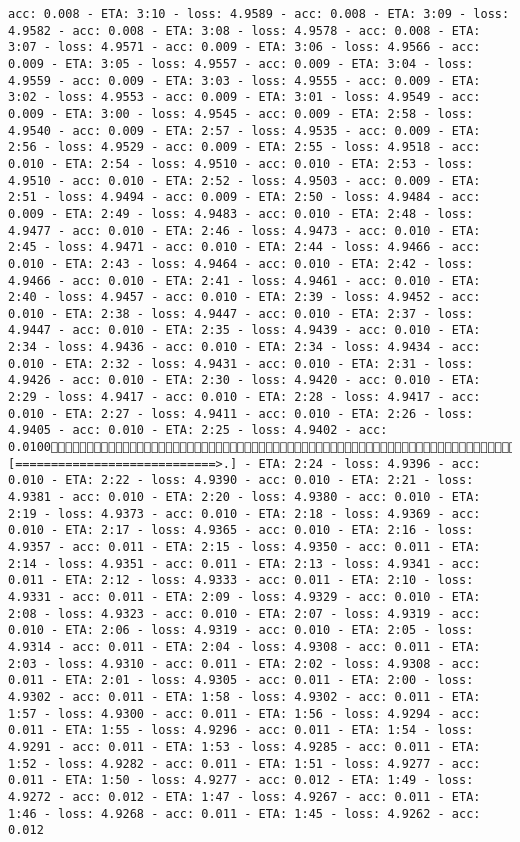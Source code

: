 \documentclass[11pt]{article}
\begin{document}
\begin{Verbatim}[commandchars=\\\{\}]
acc: 0.008 - ETA: 3:10 - loss: 4.9589 - acc: 0.008 - ETA: 3:09 - loss: 4.9582 - acc: 0.008 - ETA: 3:08 - loss: 4.9578 - acc: 0.008 - ETA: 3:07 - loss: 4.9571 - acc: 0.009 - ETA: 3:06 - loss: 4.9566 - acc: 0.009 - ETA: 3:05 - loss: 4.9557 - acc: 0.009 - ETA: 3:04 - loss: 4.9559 - acc: 0.009 - ETA: 3:03 - loss: 4.9555 - acc: 0.009 - ETA: 3:02 - loss: 4.9553 - acc: 0.009 - ETA: 3:01 - loss: 4.9549 - acc: 0.009 - ETA: 3:00 - loss: 4.9545 - acc: 0.009 - ETA: 2:58 - loss: 4.9540 - acc: 0.009 - ETA: 2:57 - loss: 4.9535 - acc: 0.009 - ETA: 2:56 - loss: 4.9529 - acc: 0.009 - ETA: 2:55 - loss: 4.9518 - acc: 0.010 - ETA: 2:54 - loss: 4.9510 - acc: 0.010 - ETA: 2:53 - loss: 4.9510 - acc: 0.010 - ETA: 2:52 - loss: 4.9503 - acc: 0.009 - ETA: 2:51 - loss: 4.9494 - acc: 0.009 - ETA: 2:50 - loss: 4.9484 - acc: 0.009 - ETA: 2:49 - loss: 4.9483 - acc: 0.010 - ETA: 2:48 - loss: 4.9477 - acc: 0.010 - ETA: 2:46 - loss: 4.9473 - acc: 0.010 - ETA: 2:45 - loss: 4.9471 - acc: 0.010 - ETA: 2:44 - loss: 4.9466 - acc: 0.010 - ETA: 2:43 - loss: 4.9464 - acc: 0.010 - ETA: 2:42 - loss: 4.9466 - acc: 0.010 - ETA: 2:41 - loss: 4.9461 - acc: 0.010 - ETA: 2:40 - loss: 4.9457 - acc: 0.010 - ETA: 2:39 - loss: 4.9452 - acc: 0.010 - ETA: 2:38 - loss: 4.9447 - acc: 0.010 - ETA: 2:37 - loss: 4.9447 - acc: 0.010 - ETA: 2:35 - loss: 4.9439 - acc: 0.010 - ETA: 2:34 - loss: 4.9436 - acc: 0.010 - ETA: 2:34 - loss: 4.9434 - acc: 0.010 - ETA: 2:32 - loss: 4.9431 - acc: 0.010 - ETA: 2:31 - loss: 4.9426 - acc: 0.010 - ETA: 2:30 - loss: 4.9420 - acc: 0.010 - ETA: 2:29 - loss: 4.9417 - acc: 0.010 - ETA: 2:28 - loss: 4.9417 - acc: 0.010 - ETA: 2:27 - loss: 4.9411 - acc: 0.010 - ETA: 2:26 - loss: 4.9405 - acc: 0.010 - ETA: 2:25 - loss: 4.9402 - acc: 0.01006660/6680 [============================>.] - ETA: 2:24 - loss: 4.9396 - acc: 0.010 - ETA: 2:22 - loss: 4.9390 - acc: 0.010 - ETA: 2:21 - loss: 4.9381 - acc: 0.010 - ETA: 2:20 - loss: 4.9380 - acc: 0.010 - ETA: 2:19 - loss: 4.9373 - acc: 0.010 - ETA: 2:18 - loss: 4.9369 - acc: 0.010 - ETA: 2:17 - loss: 4.9365 - acc: 0.010 - ETA: 2:16 - loss: 4.9357 - acc: 0.011 - ETA: 2:15 - loss: 4.9350 - acc: 0.011 - ETA: 2:14 - loss: 4.9351 - acc: 0.011 - ETA: 2:13 - loss: 4.9341 - acc: 0.011 - ETA: 2:12 - loss: 4.9333 - acc: 0.011 - ETA: 2:10 - loss: 4.9331 - acc: 0.011 - ETA: 2:09 - loss: 4.9329 - acc: 0.010 - ETA: 2:08 - loss: 4.9323 - acc: 0.010 - ETA: 2:07 - loss: 4.9319 - acc: 0.010 - ETA: 2:06 - loss: 4.9319 - acc: 0.010 - ETA: 2:05 - loss: 4.9314 - acc: 0.011 - ETA: 2:04 - loss: 4.9308 - acc: 0.011 - ETA: 2:03 - loss: 4.9310 - acc: 0.011 - ETA: 2:02 - loss: 4.9308 - acc: 0.011 - ETA: 2:01 - loss: 4.9305 - acc: 0.011 - ETA: 2:00 - loss: 4.9302 - acc: 0.011 - ETA: 1:58 - loss: 4.9302 - acc: 0.011 - ETA: 1:57 - loss: 4.9300 - acc: 0.011 - ETA: 1:56 - loss: 4.9294 - acc: 0.011 - ETA: 1:55 - loss: 4.9296 - acc: 0.011 - ETA: 1:54 - loss: 4.9291 - acc: 0.011 - ETA: 1:53 - loss: 4.9285 - acc: 0.011 - ETA: 1:52 - loss: 4.9282 - acc: 0.011 - ETA: 1:51 - loss: 4.9277 - acc: 0.011 - ETA: 1:50 - loss: 4.9277 - acc: 0.012 - ETA: 1:49 - loss: 4.9272 - acc: 0.012 - ETA: 1:47 - loss: 4.9267 - acc: 0.011 - ETA: 1:46 - loss: 4.9268 - acc: 0.011 - ETA: 1:45 - loss: 4.9262 - acc: 0.012 
\end{Verbatim}
\end{document}
